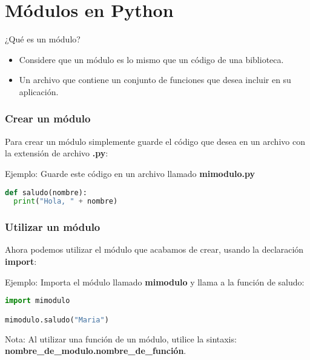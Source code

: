 
\section{Módulos en Python}

\begin{frame}[c]{¿Qué es un módulo?}
  \begin{itemize}
    \item Considere que un módulo es lo mismo que un código de una biblioteca.
    \item Un archivo que contiene un conjunto de funciones que desea incluir
      en su aplicación.
  \end{itemize}
\end{frame}

\begin{frame}[fragile]
  \frametitle{Crear un módulo}
  Para crear un módulo simplemente guarde el código que desea en un
  archivo con la extensión de archivo \textbf{.py}:

  \begin{exampleblock}{Ejemplo:}
  Guarde este código en un archivo llamado \textbf{mimodulo.py}
    \begin{lstlisting}[language=Python]
def saludo(nombre):
  print("Hola, " + nombre)
    \end{lstlisting}
  \end{exampleblock}
\end{frame}

\begin{frame}[fragile]
  \frametitle{Utilizar un módulo}
  Ahora podemos utilizar el módulo que acabamos de crear,
  usando la declaración \textbf{import}:

  \begin{exampleblock}{Ejemplo:}
  Importa el módulo llamado \textbf{mimodulo} y llama a la función de saludo:
    \begin{lstlisting}[language=Python]
import mimodulo

mimodulo.saludo("Maria")
    \end{lstlisting}
  \end{exampleblock}

  \begin{block}{Nota:}
    Al utilizar una función de un módulo, utilice la sintaxis:
    \textbf{nombre\_de\_modulo.nombre\_de\_función}.
  \end{block}
\end{frame}


